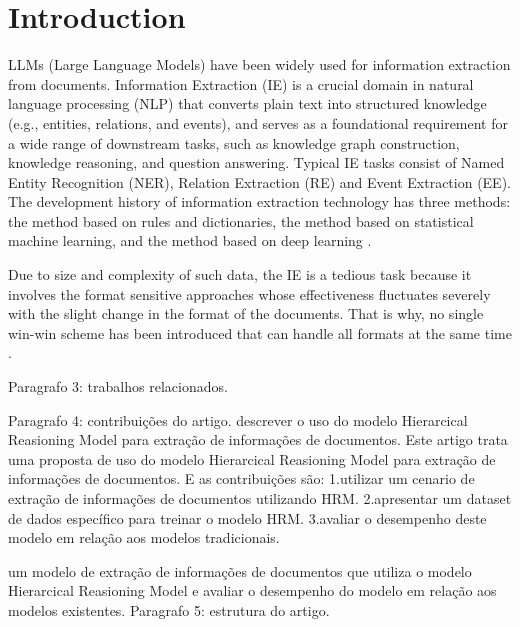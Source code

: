 \documentclass[sigconf]{acmart}
\begin{document}

\maketitle

\section{Introduction}
LLMs (Large Language Models) have been widely used for information extraction from documents.
Information Extraction (IE) is a crucial domain in natural
language processing (NLP) that converts plain text into
structured knowledge (e.g., entities, relations, and events), and
serves as a foundational requirement for a wide range of
downstream tasks, such as knowledge graph construction,
knowledge reasoning, and question answering. Typical
IE tasks consist of Named Entity Recognition (NER), Relation
Extraction (RE) and Event Extraction (EE)\cite{Xu2024}.
The development history of information extraction technology has three methods:
the method based on rules and dictionaries, the method based on statistical machine learning,
and the method based on deep learning \cite{Yang2022}.

Due to size and complexity of such data, the IE is a tedious
task because it involves the format sensitive approaches whose
effectiveness fluctuates severely with the slight change in the
format of the documents. That is why, no single win-win
scheme has been introduced that can handle all formats at the
same time \cite{Rahman2022}.

Paragrafo 3: trabalhos relacionados.

Paragrafo 4: contribuições do artigo. descrever o uso do modelo Hierarcical Reasioning Model para extração de informações de documentos.
Este artigo trata uma proposta de uso do modelo Hierarcical Reasioning Model para extração de informações de documentos. 
E as contribuições são: 
1.utilizar um cenario de extração de informações de documentos utilizando HRM. 
2.apresentar um dataset de dados específico para treinar o modelo HRM. 
3.avaliar o desempenho deste modelo em relação aos modelos tradicionais.

um modelo de extração de informações de documentos que utiliza o modelo Hierarcical Reasioning Model e avaliar o desempenho do modelo em relação aos modelos existentes.
Paragrafo 5: estrutura do artigo.
\end{document}
